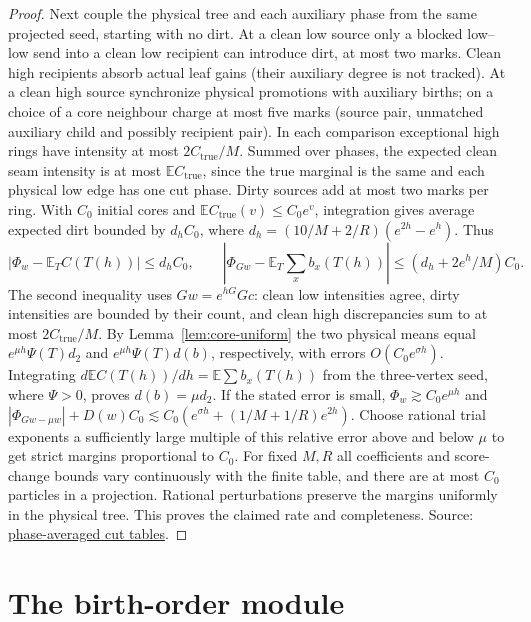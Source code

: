 \documentclass[11pt]{article}
\newcommand{\proofsrc}[2]{\href{https://github.com/uzay-eth/friend-tree-exponent/blob/a0972085ad72ad5685ae7b424988648d1965e73c/#1}{#2}}
\theoremstyle{remark}
\numberwithin{equation}{section}
\begin{document}
\begin{proof}
Next couple the physical tree and each auxiliary phase from the same projected seed, starting with no dirt. At a clean low source only a blocked low--low send into a clean low recipient can introduce dirt, at most two marks. Clean high recipients absorb actual leaf gains (their auxiliary degree is not tracked). At a clean high source synchronize physical promotions with auxiliary births; on a choice of a core neighbour charge at most five marks (source pair, unmatched auxiliary child and possibly recipient pair). In each comparison exceptional high rings have intensity at most $2C_{\mathrm{true}}/M$. Summed over phases, the expected clean seam intensity is at most $\mathbb E C_{\mathrm{true}}$, since the true marginal is the same and each physical low edge has one cut phase. Dirty sources add at most two marks per ring. With $C_0$ initial cores and $\mathbb E C_{\mathrm{true}}(v)\le C_0e^v$, integration gives average expected dirt bounded by $d_h C_0$, where $d_h=(10/M+2/R)(e^{2h}-e^h)$. Thus
\[
 |\Phi_w-\mathbb E_T C(T(h))|\le d_h C_0,\qquad
 |\Phi_{Gw}-\mathbb E_T\textstyle\sum_x b_x(T(h))|\le(d_h+2e^h/M)C_0.
\]
The second inequality uses $Gw=e^{hG}Gc$: clean low intensities agree, dirty intensities are bounded by their count, and clean high discrepancies sum to at most $2C_{\mathrm{true}}/M$. By Lemma~\ref{lem:core-uniform} the two physical means equal $e^{\mu h}\Psi(T)d_2$ and $e^{\mu h}\Psi(T)d(b)$, respectively, with errors $O(C_0 e^{\sigma h})$. Integrating $d\mathbb E C(T(h))/dh=\mathbb E\sum b_x(T(h))$ from the three-vertex seed, where $\Psi>0$, proves $d(b)=\mu d_2$. If the stated error is small, $\Phi_w\gtrsim C_0 e^{\mu h}$ and $|\Phi_{Gw-\mu w}|+D(w)C_0\lesssim C_0(e^{\sigma h}+(1/M+1/R)e^{2h})$. Choose rational trial exponents a sufficiently large multiple of this relative error above and below $\mu$ to get strict margins proportional to $C_0$. For fixed $M,R$ all coefficients and score-change bounds vary continuously with the finite table, and there are at most $C_0$ particles in a projection. Rational perturbations preserve the margins uniformly in the physical tree. This proves the claimed rate and completeness. Source: \proofsrc{round2/proofs/astra/source/round2/fringe/local-certificates.md}{phase-averaged cut tables}.
\end{proof}

\part{The birth-order module}
\end{document}
